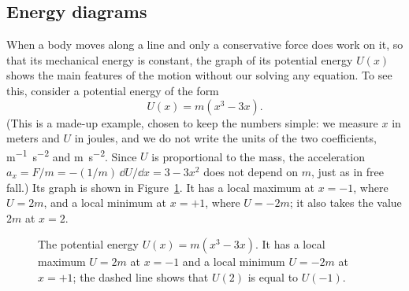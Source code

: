 \documentclass[11pt,a4paper]{article}
\begin{document}
\subsection{Energy diagrams}\label{sec:diagrams}

When a body moves along a line and only a conservative force does work on it, so that its
mechanical energy is constant, the graph of its potential energy $U(x)$ shows the main features of
the motion without our solving any equation. To see this, consider a potential energy of the form
\begin{equation}\label{eq:cubic}
  U(x) = m(x^3 - 3x) .
\end{equation}
(This is a made-up example, chosen to keep the numbers simple: we measure $x$ in meters and $U$ in
joules, and we do not write the units of the two coefficients, \unit{m^{-1}.s^{-2}} and
\unit{m.s^{-2}}. Since $U$ is proportional to the mass, the acceleration
$a_x = F/m = -(1/m)\,\dd U/\dd x = 3 - 3x^2$ does not depend on $m$, just as in free fall.) Its
graph is shown in Figure~\ref{fig:cubic}. It has a local maximum at $x = -1$, where $U = 2m$, and a
local minimum at $x = +1$, where $U = -2m$; it also takes the value $2m$ at $x = 2$.

\begin{figure}[ht]
\centering
{}
\caption{The potential energy $U(x) = m(x^3 - 3x)$. It has a local maximum $U = 2m$ at $x = -1$ and
a local minimum $U = -2m$ at $x = +1$; the dashed line shows that $U(2)$ is equal to $U(-1)$.}
\label{fig:cubic}
\end{figure}
\end{document}
